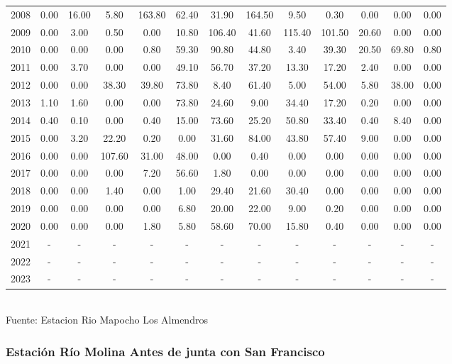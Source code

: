 \documentclass{article} %
\begin{document}
\begin{table}[H]
{\begin{tabular}{|c|c|c|c|c|c|c|c|c|c|c|c|c|}
        2008 & 0.00 & 16.00 & 5.80 & 163.80 & 62.40 & 31.90 & 164.50 & 9.50 & 0.30 & 0.00 & 0.00 & 0.00 \\
        2009 & 0.00 & 3.00 & 0.50 & 0.00 & 10.80 & 106.40 & 41.60 & 115.40 & 101.50 & 20.60 & 0.00 & 0.00 \\
        2010 & 0.00 & 0.00 & 0.00 & 0.80 & 59.30 & 90.80 & 44.80 & 3.40 & 39.30 & 20.50 & 69.80 & 0.80 \\
        2011 & 0.00 & 3.70 & 0.00 & 0.00 & 49.10 & 56.70 & 37.20 & 13.30 & 17.20 & 2.40 & 0.00 & 0.00 \\
        2012 & 0.00 & 0.00 & 38.30 & 39.80 & 73.80 & 8.40 & 61.40 & 5.00 & 54.00 & 5.80 & 38.00 & 0.00 \\
        2013 & 1.10 & 1.60 & 0.00 & 0.00 & 73.80 & 24.60 & 9.00 & 34.40 & 17.20 & 0.20 & 0.00 & 0.00 \\
        2014 & 0.40 & 0.10 & 0.00 & 0.40 & 15.00 & 73.60 & 25.20 & 50.80 & 33.40 & 0.40 & 8.40 & 0.00 \\
        2015 & 0.00 & 3.20 & 22.20 & 0.20 & 0.00 & 31.60 & 84.00 & 43.80 & 57.40 & 9.00 & 0.00 & 0.00 \\
        2016 & 0.00 & 0.00 & 107.60 & 31.00 & 48.00 & 0.00 & 0.40 & 0.00 & 0.00 & 0.00 & 0.00 & 0.00 \\
        2017 & 0.00 & 0.00 & 0.00 & 7.20 & 56.60 & 1.80 & 0.00 & 0.00 & 0.00 & 0.00 & 0.00 & 0.00 \\
        2018 & 0.00 & 0.00 & 1.40 & 0.00 & 1.00 & 29.40 & 21.60 & 30.40 & 0.00 & 0.00 & 0.00 & 0.00 \\
        2019 & 0.00 & 0.00 & 0.00 & 0.00 & 6.80 & 20.00 & 22.00 & 9.00 & 0.20 & 0.00 & 0.00 & 0.00 \\
        2020 & 0.00 & 0.00 & 0.00 & 1.80 & 5.80 & 58.60 & 70.00 & 15.80 & 0.40 & 0.00 & 0.00 & 0.00 \\
        2021 & - & - & - & - & - & - & - & - & - & - & - & - \\
        2022 & - & - & - & - & - & - & - & - & - & - & - & - \\
        2023 & - & - & - & - & - & - & - & - & - & - & - & - \\
        \hline
    \end{tabular}%
    }
    \label{tab:precipitaciones_rio_mapocho}
    \vspace{0.2cm}
    \\Fuente: Estacion Rio Mapocho Los Almendros
\end{table}


\subsubsection{Estación Río Molina Antes de junta con San Francisco}
\end{document}

